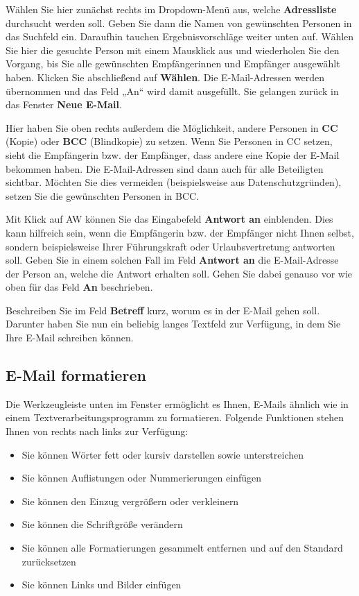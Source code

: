 \documentclass[
  letterpaper,
  DIV=11,
  numbers=noendperiod]{scrreprt}
\providecommand{\tightlist}{%
  \setlength{\itemsep}{0pt}\setlength{\parskip}{0pt}}\usepackage{longtable,booktabs,array}
\begin{document}
Wählen Sie hier zunächst rechts im Dropdown-Menü aus, welche
\textbf{Adressliste} durchsucht werden soll. Geben Sie dann die Namen
von gewünschten Personen in das Suchfeld ein. Daraufhin tauchen
Ergebnisvorschläge weiter unten auf. Wählen Sie hier die gesuchte Person
mit einem Mausklick aus und wiederholen Sie den Vorgang, bis Sie alle
gewünschten Empfängerinnen und Empfänger ausgewählt haben. Klicken Sie
abschließend auf \textbf{Wählen}. Die E-Mail-Adressen werden übernommen
und das Feld „An`` wird damit ausgefüllt. Sie gelangen zurück in das
Fenster \textbf{Neue E-Mail}.

Hier haben Sie oben rechts außerdem die Möglichkeit, andere Personen in
\textbf{CC} (Kopie) oder \textbf{BCC} (Blindkopie) zu setzen. Wenn Sie
Personen in CC setzen, sieht die Empfängerin bzw. der Empfänger, dass
andere eine Kopie der E-Mail bekommen haben. Die E-Mail-Adressen sind
dann auch für alle Beteiligten sichtbar. Möchten Sie dies vermeiden
(beispielsweise aus Datenschutzgründen), setzen Sie die gewünschten
Personen in BCC.

Mit Klick auf AW können Sie das Eingabefeld \textbf{Antwort an}
einblenden. Dies kann hilfreich sein, wenn die Empfängerin bzw. der
Empfänger nicht Ihnen selbst, sondern beispielsweise Ihrer Führungskraft
oder Urlaubsvertretung antworten soll. Geben Sie in einem solchen Fall
im Feld \textbf{Antwort an} die E-Mail-Adresse der Person an, welche die
Antwort erhalten soll. Gehen Sie dabei genauso vor wie oben für das Feld
\textbf{An} beschrieben.

Beschreiben Sie im Feld \textbf{Betreff} kurz, worum es in der E-Mail
gehen soll. Darunter haben Sie nun ein beliebig langes Textfeld zur
Verfügung, in dem Sie Ihre E-Mail schreiben können.

\subsection{E-Mail formatieren}\label{e-mail-formatieren}

Die Werkzeugleiste unten im Fenster ermöglicht es Ihnen, E-Mails ähnlich
wie in einem Textverarbeitungsprogramm zu formatieren. Folgende
Funktionen stehen Ihnen von rechts nach links zur Verfügung:

\begin{itemize}
\tightlist
\item
  Sie können Wörter fett oder kursiv darstellen sowie unterstreichen
\item
  Sie können Auflistungen oder Nummerierungen einfügen
\item
  Sie können den Einzug vergrößern oder verkleinern
\item
  Sie können die Schriftgröße verändern
\item
  Sie können alle Formatierungen gesammelt entfernen und auf den
  Standard zurücksetzen
\item
  Sie können Links und Bilder einfügen
\end{itemize}
\end{document}
